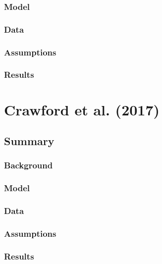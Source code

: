 \subsubsection{Model}



\subsubsection{Data}



\subsubsection{Assumptions}



\subsubsection{Results}



\section{Crawford et al. (2017)}

\subsection{Summary}

\subsubsection{Background}



\subsubsection{Model}



\subsubsection{Data}



\subsubsection{Assumptions}



\subsubsection{Results}

